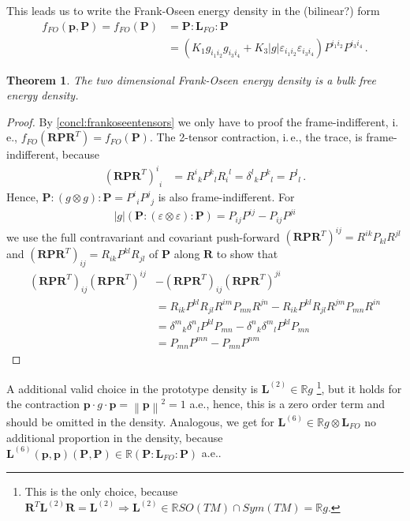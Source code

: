 \documentclass{scrartcl}
\newcommand{\germanred}[1]{{\color{red}\selectlanguage{ngerman}#1\selectlanguage{english}}}
\newcommand{\R}{\mathbb{R}}
\newcommand{\ie}{i.\,e.}%
\newcommand{\formPeriod}{\,\text{.}}
\newcommand{\pb}{\mathbf{p}}%
\newcommand{\Pb}{\mathbf{P}}%
\newcommand{\Lb}{\mathbf{L}}%
\newcommand{\Rb}{\mathbf{R}}
\newcommand{\sftensor}[3]{{{#1}^{#2}}_{#3}}
\newcommand{\fstensor}[3]{{{#1}_{#2}}^{#3}}
\newtheorem{theorem}{Theorem}
\begin{document}
      This leads us to write the Frank-Oseen energy density in the (\germanred{bilinear?}) form
      \begin{align}
        f_{FO}(\pb,\Pb) = f_{FO}(\Pb) &= \Pb:\Lb_{FO}:\Pb \\
            &= \left(K_{1}g_{i_{1}i_{2}}g_{i_{3}i_{4}} + K_{3}|g|\varepsilon_{i_{1}i_{2}}\varepsilon_{i_{3}i_{4}}\right)
               P^{i_{1}i_{2}}P^{i_{3}i_{4}} \formPeriod
      \end{align}
      \begin{theorem}
        The two dimensional Frank-Oseen energy density is a bulk free energy density.
      \end{theorem}
      \begin{proof}
        By \autoref{concl:frankoseentensors} we only have to proof the frame-indifferent,
        \ie, \( f_{FO}(\Rb\Pb\Rb^{T}) = f_{FO}(\Pb) \).
        The 2-tensor contraction, \ie, the trace, is frame-indifferent, because
        \begin{align}
          \sftensor{(\Rb\Pb\Rb^{T})}{i}{i}
            &= \sftensor{R}{i}{k}\sftensor{P}{k}{l}\fstensor{R}{i}{l}
            = \sftensor{\delta}{l}{k}\sftensor{P}{k}{l}
            = \sftensor{P}{l}{l} \formPeriod
        \end{align}
        Hence, \(
          \Pb:( g \otimes g ): \Pb 
              = \sftensor{P}{i}{i}\sftensor{P}{j}{j}
        \)
        is also frame-indifferent.
        For 
        \begin{align}
          |g|\left(\Pb:( \varepsilon \otimes \varepsilon ): \Pb\right)=  P_{ij}P^{ij}-P_{ij}P^{ji}
        \end{align}
        we use the full contravariant and covariant push-forward
        \( 
          \left( \Rb\Pb\Rb^{T} \right)^{ij} = R^{ik}P_{kl}R^{jl}
        \) and \( 
          \left( \Rb\Pb\Rb^{T} \right)_{ij} = R_{ik}P^{kl}R_{jl}
        \)
        of \( \Pb \) along \( \Rb \) to show that
        \begin{align}
          \left( \Rb\Pb\Rb^{T} \right)_{ij}\left( \Rb\Pb\Rb^{T} \right)^{ij}&-\left( \Rb\Pb\Rb^{T} \right)_{ij}\left( \Rb\Pb\Rb^{T}
          \right)^{ji}\\
            &= R_{ik}P^{kl}R_{jl}R^{im}P_{mn}R^{jn} -  R_{ik}P^{kl}R_{jl}R^{jm}P_{mn}R^{in} \\
            &= \sftensor{\delta}{m}{k}\sftensor{\delta}{n}{l}P^{kl}P_{mn}
              -\sftensor{\delta}{n}{k}\sftensor{\delta}{m}{l}P^{kl}P_{mn}\\
            &= P_{mn}P^{mn}-P_{mn}P^{nm}
        \end{align}
      \end{proof}

      A additional valid choice in the prototype density is  \( \Lb^{(2)}\in\R g \)
      \footnote{This is the only choice, because 
              \( \Rb^{T}\Lb^{(2)}\Rb=\Lb^{(2)} \Rightarrow \Lb^{(2)}\in \R SO(TM)\cap Sym(TM) = \R g \).}, 
      but it holds for the contraction \( \pb\cdot g \cdot\pb = \left\| \pb \right\|^{2} = 1 \) a.e.,
      hence, this is a zero order term and should be omitted in the density. 
      Analogous, we get for \( \Lb^{(6)}\in \R g\otimes\Lb_{FO} \) no additional proportion in the density,
      because \( \Lb^{(6)}(\pb,\pb)(\Pb,\Pb)\in \R  (\Pb:\Lb_{FO}:\Pb) \) a.e..
\end{document}
